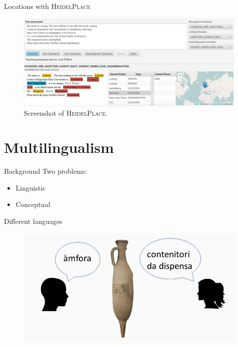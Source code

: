 \documentclass[xcolor=x11names, aspectratio=169,usenames,dvipsnames]{beamer}
\begin{document}

\begin{frame}{Locations with \textsc{HeidelPlace}}
\begin{figure}
\hspace*{-1em}\includegraphics[width=1.025\textwidth]{img/heidelplace.png}
\caption{Screenshot of \textsc{HeidelPlace}.}
\end{figure}
\end{frame}

\section{Multilingualism}

\begin{frame}{Background}
Two problems:
\begin{itemize}
\item Linguistic
\item Conceptual
\end{itemize}
\end{frame}

\begin{frame}{Different languages}
\begin{center}
\begin{figure}
\includegraphics[width=\textwidth]{img/tim_vocab_1.png}
\end{figure}
\end{center}
\end{frame}
\end{document}
